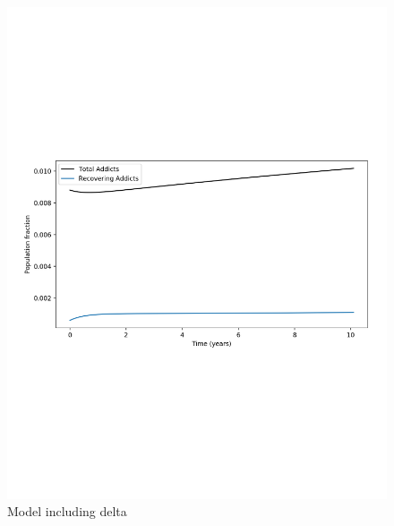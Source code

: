 \documentclass[12pt]{article}
\begin{document}
\begin{figure}[!htb]
\hspace{-.85cm}
\begin{minipage}{.6\textwidth}
\centering
\includegraphics[width=.94\linewidth, height=0.28\textheight]{plot_with_delta_total}
\caption{Model including delta}
\end{minipage}
\hspace{-1.2cm}
\begin{minipage}{.6\textwidth}
\vspace{.8cm}
\centering

\end{minipage}
\end{figure}
\end{document}
